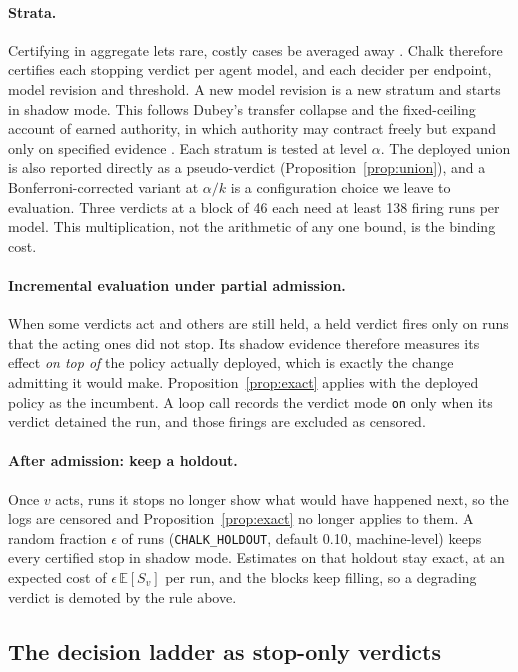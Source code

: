 \documentclass[11pt]{article}
\theoremstyle{remark}
\begin{document}
\paragraph{Strata.}
Certifying in aggregate lets rare, costly cases be averaged away \citep{rahman2026rolestratified}. Chalk therefore certifies each stopping verdict per agent model, and each decider per endpoint, model revision and threshold. A new model revision is a new stratum and starts in shadow mode. This follows Dubey's transfer collapse \citep{dubey2026realtime} and the fixed-ceiling account of earned authority, in which authority may contract freely but expand only on specified evidence \citep{zhang2026authorized}. Each stratum is tested at level $\alpha$. The deployed union is also reported directly as a pseudo-verdict (Proposition~\ref{prop:union}), and a Bonferroni-corrected variant at $\alpha/k$ is a configuration choice we leave to evaluation. Three verdicts at a block of 46 each need at least 138 firing runs per model. This multiplication, not the arithmetic of any one bound, is the binding cost.

\paragraph{Incremental evaluation under partial admission.}
When some verdicts act and others are still held, a held verdict fires only on runs that the acting ones did not stop. Its shadow evidence therefore measures its effect \emph{on top of} the policy actually deployed, which is exactly the change admitting it would make. Proposition~\ref{prop:exact} applies with the deployed policy as the incumbent. A loop call records the verdict mode \texttt{on} only when its verdict detained the run, and those firings are excluded as censored.

\paragraph{After admission: keep a holdout.}
Once $v$ acts, runs it stops no longer show what would have happened next, so the logs are censored and Proposition~\ref{prop:exact} no longer applies to them. A random fraction $\epsilon$ of runs (\texttt{CHALK\_HOLDOUT}, default 0.10, machine-level) keeps every certified stop in shadow mode. Estimates on that holdout stay exact, at an expected cost of $\epsilon\,\mathbb{E}[S_v]$ per run, and the blocks keep filling, so a degrading verdict is demoted by the rule above.

\subsection{The decision ladder as stop-only verdicts}
\end{document}

